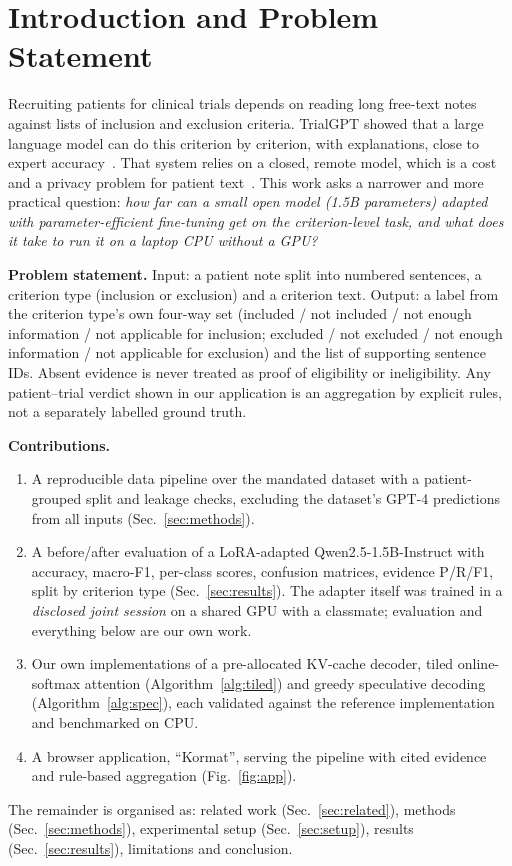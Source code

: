 \section{Introduction and Problem Statement}
\label{sec:intro}
Recruiting patients for clinical trials depends on reading long free-text notes against lists of inclusion and exclusion criteria. TrialGPT showed that a large language model can do this criterion by criterion, with explanations, close to expert accuracy~\cite{jin2024trialgpt}. That system relies on a closed, remote model, which is a cost and a privacy problem for patient text~\cite{nievas2023distilling}. This work asks a narrower and more practical question: \emph{how far can a small open model (1.5B parameters) adapted with parameter-efficient fine-tuning get on the criterion-level task, and what does it take to run it on a laptop CPU without a GPU?}

\textbf{Problem statement.} Input: a patient note split into numbered sentences, a criterion type (inclusion or exclusion) and a criterion text. Output: a label from the criterion type's own four-way set (included / not included / not enough information / not applicable for inclusion; excluded / not excluded / not enough information / not applicable for exclusion) and the list of supporting sentence IDs. Absent evidence is never treated as proof of eligibility or ineligibility. Any patient--trial verdict shown in our application is an aggregation by explicit rules, not a separately labelled ground truth.

\textbf{Contributions.}
\begin{enumerate}
\item A reproducible data pipeline over the mandated dataset with a patient-grouped split and leakage checks, excluding the dataset's GPT-4 predictions from all inputs (Sec.~\ref{sec:methods}).
\item A before/after evaluation of a LoRA-adapted Qwen2.5-1.5B-Instruct with accuracy, macro-F1, per-class scores, confusion matrices, evidence P/R/F1, split by criterion type (Sec.~\ref{sec:results}). The adapter itself was trained in a \emph{disclosed joint session} on a shared GPU with a classmate; evaluation and everything below are our own work.
\item Our own implementations of a pre-allocated KV-cache decoder, tiled online-softmax attention (Algorithm~\ref{alg:tiled}) and greedy speculative decoding (Algorithm~\ref{alg:spec}), each validated against the reference implementation and benchmarked on CPU.
\item A browser application, ``Kormat'', serving the pipeline with cited evidence and rule-based aggregation (Fig.~\ref{fig:app}).
\end{enumerate}
The remainder is organised as: related work (Sec.~\ref{sec:related}), methods (Sec.~\ref{sec:methods}), experimental setup (Sec.~\ref{sec:setup}), results (Sec.~\ref{sec:results}), limitations and conclusion.
